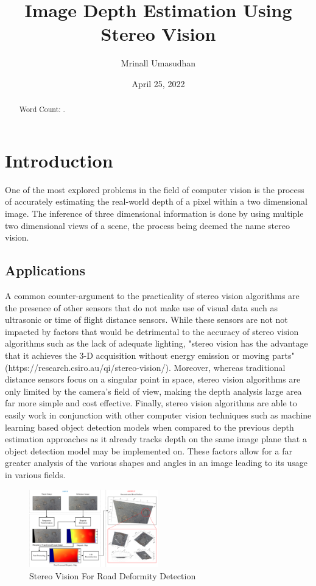 \documentclass[11pt]{scrartcl}
\begin{document}
\title{Image Depth Estimation Using Stereo Vision}
\author{Mrinall Umasudhan}
\date{April 25, 2022}
\maketitle
{}

\begin{abstract}
  Word Count: .
\end{abstract}
\tableofcontents


\newpage

\section{Introduction}
One of the most explored problems in the field of computer vision is the process
of accurately estimating the real-world depth of a pixel within a two dimensional
image. The inference of three dimensional information is done by using multiple two
dimensional views of a scene, the process being deemed the name stereo vision.

\subsection{Applications}
A common counter-argument to the practicality of stereo vision algorithms
are the presence of other sensors that do not make use of visual data such
as ultrasonic or time of flight distance sensors. While these sensors are not
not impacted by factors that would be detrimental to the accuracy of stereo
vision algorithms such as the lack of adequate lighting,
"stereo vision has the advantage that it achieves the 3-D acquisition without
energy emission or moving parts" (https://research.csiro.au/qi/stereo-vision/). Moreover,
whereas traditional distance sensors focus on a singular point in space, stereo vision
algorithms are only limited by the camera's field of view, making the depth analysis
large area far more simple and cost effective. Finally, stereo vision algorithms are able
to easily work in conjunction with other
computer vision techniques such as machine learning based object detection
models when compared to the previous depth estimation approaches as it already
tracks depth on the same image plane that a object detection model may be implemented on.
These factors allow for a far greater analysis of the
various shapes and angles in an image leading to its usage in various fields.
\\
\begin{figure}
  \centering
  \includegraphics[width=0.5\textwidth]{img1.png}
  \caption{\label{fig:frog1}Stereo Vision For Road Deformity Detection}
\end{figure}
\end{document}

